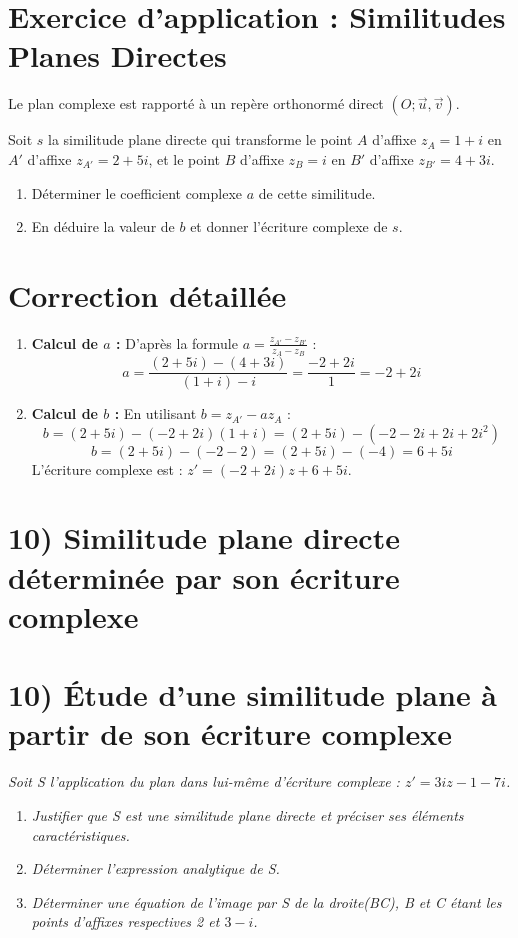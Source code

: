\documentclass[12pt,a4paper]{article}
\begin{document}
\section*{Exercice d'application : Similitudes Planes Directes}

Le plan complexe est rapporté à un repère orthonormé direct $(O; \vec{u}, \vec{v})$.

Soit $s$ la similitude plane directe qui transforme le point $A$ d'affixe $z_A = 1 + i$ en $A'$ d'affixe $z_{A'} = 2 + 5i$, et le point $B$ d'affixe $z_B = i$ en $B'$ d'affixe $z_{B'} = 4 + 3i$.
\begin{enumerate}
    \item Déterminer le coefficient complexe $a$ de cette similitude.
    \item En déduire la valeur de $b$ et donner l'écriture complexe de $s$.
\end{enumerate}

\section*{Correction détaillée}

\begin{enumerate}
    \item \textbf{Calcul de $a$ :}
    D'après la formule $a = \frac{z_{A'} - z_{B'}}{z_A - z_B}$ :
    \[ a = \frac{(2 + 5i) - (4 + 3i)}{(1 + i) - i} = \frac{-2 + 2i}{1} = -2 + 2i \]
    
    \item \textbf{Calcul de $b$ :}
    En utilisant $b = z_{A'} - az_A$ :
    \[ b = (2 + 5i) - (-2 + 2i)(1 + i) = (2 + 5i) - (-2 - 2i + 2i + 2i^2) \]
    \[ b = (2 + 5i) - (-2 - 2) = (2 + 5i) - (-4) = 6 + 5i \]
    L'écriture complexe est : \textbf{$z' = (-2 + 2i)z + 6 + 5i$}.
\end{enumerate}

\section*{10) Similitude plane directe déterminée par son écriture complexe}
\section*{10) Étude d'une similitude plane à partir de son écriture complexe}


\textit{Soit S l'application du plan dans lui-même d'écriture complexe : \(z' = 3i z - 1 - 7i\).}

\begin{enumerate}
    \item \textit{Justifier que S est une similitude plane directe et préciser ses éléments caractéristiques.}
    \item \textit{Déterminer l'expression analytique de S.}
    \item \textit{Déterminer une équation de l'image par S de la droite(BC), B et C étant les points d'affixes respectives 2 et \(3 - i\).}
\end{enumerate}
\end{document}
